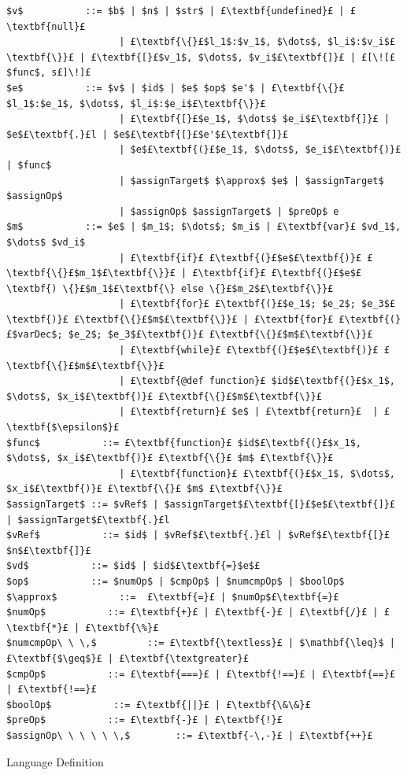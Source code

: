 \documentclass[12pt,a4paper,twoside,openright]{report}
\theoremstyle{definition}
\theoremstyle{dotless}
\begin{document}
\begin{listing}
  \begin{lstlisting}[mathescape, escapechar=£]
$v$           ::= $b$ | $n$ | $str$ | £\textbf{undefined}£ | £\textbf{null}£
                    | £\textbf{\{}£$l_1$:$v_1$, $\dots$, $l_i$:$v_i$£\textbf{\}}£ | £\textbf{[}£$v_1$, $\dots$, $v_i$£\textbf{]}£ | £[\![£$func$, s£]\!]£
$e$           ::= $v$ | $id$ | $e$ $op$ $e'$ | £\textbf{\{}£$l_1$:$e_1$, $\dots$, $l_i$:$e_i$£\textbf{\}}£ 
                    | £\textbf{[}£$e_1$, $\dots$ $e_i$£\textbf{]}£ | $e$£\textbf{.}£l | $e$£\textbf{[}£$e'$£\textbf{]}£ 
                    | $e$£\textbf{(}£$e_1$, $\dots$, $e_i$£\textbf{)}£ | $func$
                    | $assignTarget$ $\approx$ $e$ | $assignTarget$ $assignOp$ 
                    | $assignOp$ $assignTarget$ | $preOp$ e
$m$           ::= $e$ | $m_1$; $\dots$; $m_i$ | £\textbf{var}£ $vd_1$, $\dots$ $vd_i$ 
                    | £\textbf{if}£ £\textbf{(}£$e$£\textbf{)}£ £\textbf{\{}£$m_1$£\textbf{\}}£ | £\textbf{if}£ £\textbf{(}£$e$£\textbf{) \{}£$m_1$£\textbf{\} else \{}£$m_2$£\textbf{\}}£ 
                    | £\textbf{for}£ £\textbf{(}£$e_1$; $e_2$; $e_3$£\textbf{)}£ £\textbf{\{}£$m$£\textbf{\}}£ | £\textbf{for}£ £\textbf{(}£$varDec$; $e_2$; $e_3$£\textbf{)}£ £\textbf{\{}£$m$£\textbf{\}}£ 
                    | £\textbf{while}£ £\textbf{(}£$e$£\textbf{)}£ £\textbf{\{}£$m$£\textbf{\}}£ 
                    | £\textbf{@def function}£ $id$£\textbf{(}£$x_1$, $\dots$, $x_i$£\textbf{)}£ £\textbf{\{}£$m$£\textbf{\}}£
                    | £\textbf{return}£ $e$ | £\textbf{return}£  | £\textbf{$\epsilon$}£
$func$           ::= £\textbf{function}£ $id$£\textbf{(}£$x_1$, $\dots$, $x_i$£\textbf{)}£ £\textbf{\{}£ $m$ £\textbf{\}}£ 
                    | £\textbf{function}£ £\textbf{(}£$x_1$, $\dots$, $x_i$£\textbf{)}£ £\textbf{\{}£ $m$ £\textbf{\}}£
$assignTarget$ ::= $vRef$ | $assignTarget$£\textbf{[}£$e$£\textbf{]}£ | $assignTarget$£\textbf{.}£l
$vRef$           ::= $id$ | $vRef$£\textbf{.}£l | $vRef$£\textbf{[}£$n$£\textbf{]}£
$vd$           ::= $id$ | $id$£\textbf{=}$e$£
$op$           ::= $numOp$ | $cmpOp$ | $numcmpOp$ | $boolOp$
$\approx$           ::=  £\textbf{=}£ | $numOp$£\textbf{=}£
$numOp$           ::= £\textbf{+}£ | £\textbf{-}£ | £\textbf{/}£ | £\textbf{*}£ | £\textbf{\%}£
$numcmpOp\ \ \,$         ::= £\textbf{\textless}£ | $\mathbf{\leq}$ | £\textbf{$\geq$}£ | £\textbf{\textgreater}£
$cmpOp$           ::= £\textbf{===}£ | £\textbf{!==}£ | £\textbf{==}£ | £\textbf{!==}£
$boolOp$           ::= £\textbf{||}£ | £\textbf{\&\&}£
$preOp$           ::= £\textbf{-}£ | £\textbf{!}£
$assignOp\ \ \ \ \ \,$        ::= £\textbf{-\,-}£ | £\textbf{++}£
  \end{lstlisting}
  \caption{Language Definition}
  \label{lst:langdef}
\end{listing}
\end{document}
